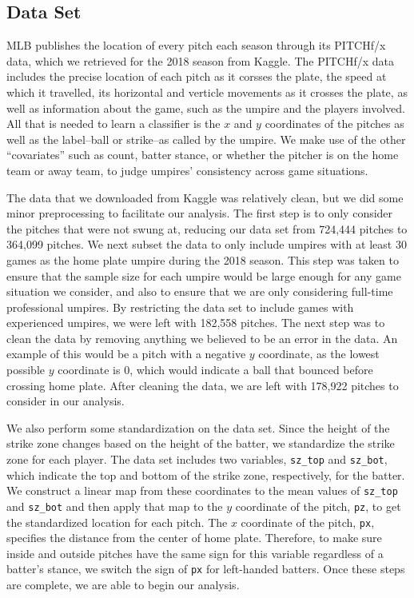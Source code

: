 \documentclass[letterpaper,12pt]{article}
\begin{document}
\subsection{Data Set}\label{sec:data}

MLB publishes the location of every pitch each season through its PITCHf/x data, which we retrieved for the 2018 season from Kaggle\cite{schale2019mlb}.
The PITCHf/x data includes the precise location of each pitch as it corsses the plate, the speed at which it travelled, its horizontal and verticle movements as it crosses the plate, as well as information about the game, such as the umpire and the players involved.
All that is needed to learn a classifier is the $x$ and $y$ coordinates of the pitches as well as the label--ball or strike--as called by the umpire.
We make use of the other ``covariates'' such as count, batter stance, or whether the pitcher is on the home team or away team, to judge umpires' consistency across game situations.

The data that we downloaded from Kaggle was relatively clean, but we did some minor preprocessing to facilitate our analysis.
The first step is to only consider the pitches that were not swung at, reducing our data set from 724,444 pitches to 364,099 pitches.
We next subset the data to only include umpires with at least 30 games as the home plate umpire during the 2018 season. 
This step was taken to ensure that the sample size for each umpire would be large enough for any game situation we consider, and also to ensure that we are only considering full-time professional umpires.
By restricting the data set to include games with experienced umpires, we were left with 182,558 pitches.
The next step was to clean the data by removing anything we believed to be an error in the data. 
An example of this would be a pitch with a negative $y$ coordinate, as the lowest possible $y$ coordinate is 0, which would indicate a ball that bounced before crossing home plate.
After cleaning the data, we are left with 178,922 pitches to consider in our analysis.

We also perform some standardization on the data set. 
Since the height of the strike zone changes based on the height of the batter, we standardize the strike zone for each player.
The data set includes two variables, \verb+sz_top+ and \verb+sz_bot+, which indicate the top and bottom of the strike zone, respectively, for the batter. 
We construct a linear map from these coordinates to the mean values of \verb+sz_top+ and \verb+sz_bot+ and then apply that map to the $y$ coordinate of the pitch, \verb+pz+, to get the standardized location for each pitch. 
The $x$ coordinate of the pitch, \verb+px+, specifies the distance from the center of home plate. 
Therefore, to make sure inside and outside pitches have the same sign for this variable regardless of a batter's stance, we switch the sign of \verb+px+ for left-handed batters.
Once these steps are complete, we are able to begin our analysis.
\end{document}
